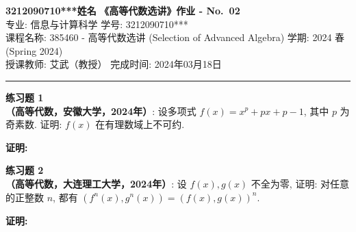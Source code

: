 \documentclass[a4paper, 11pt]{article}
\newenvironment{problem}[2][练习题]
    { \begin{mdframed}[backgroundcolor=gray!5] \textbf{#1 #2} \\}
    {  \end{mdframed}}
\newenvironment{solution2}
    {\textbf{证明:}}
    {}
\begin{document}
\noindent
\large\textbf{3212090710***\quad 姓名} \hfill \textbf{《高等代数选讲》作业 - No.~\Huge{02}}   \\
专业: 信息与计算科学 \hfill 学号: 3212090710*** \\
\normalsize 课程名称: 385460 - 高等代数选讲 (Selection of Advanced Algebra) \hfill 学期: 2024 春 (Spring 2024)\\
授课教师: 艾武（教授） \hfill 完成时间: 2024年03月18日 \\
\noindent\rule{7in}{1.8pt}

\begin{problem}{1}
\textbf{（高等代数，安徽大学，2024年）}: 设多项式 $f(x)=x^p+p x+p-1$, 其中 $p$ 为奇素数. 证明: $f(x)$ 在有理数域上不可约.
\end{problem}

\begin{solution2}

\end{solution2} 


\begin{problem}{2}
\textbf{（高等代数，大连理工大学，2024年）}: 设 $f(x), g(x)$ 不全为零, 证明: 对任意的正整数 $n$, 都有 $\left(f^n(x), g^n(x)\right)=(f(x), g(x))^n$.
\end{problem}

\begin{solution2}

\end{solution2} 





\end{document}
